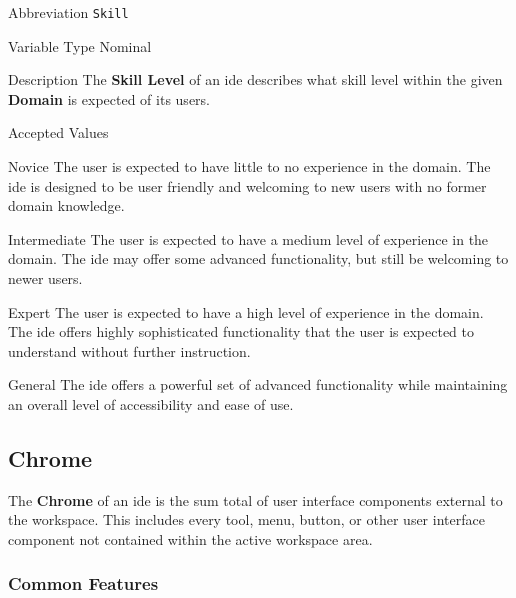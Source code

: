 \begin{AlignedDesc}
  \item[Abbreviation] \texttt{Skill}

  \item[Variable Type] Nominal

  \item[Description] The \textbf{Skill Level} of an \ac{ide} describes what
  skill level within the given \textbf{Domain} is expected of its users.

  \item[Accepted Values]

  \begin{AlignedDesc}
    \item[Novice] The user is expected to have little to no experience in
    the domain. The \ac{ide} is designed to be user friendly and welcoming
    to new users with no former domain knowledge.
    \item[Intermediate] The user is expected to have a medium level of
    experience in the domain. The \ac{ide} may offer some advanced
    functionality, but still be welcoming to newer users.
    \item[Expert] The user is expected to have a high level of experience
    in the domain. The \ac{ide} offers highly sophisticated functionality
    that the user is expected to understand without further instruction.
    \item[General] The \ac{ide} offers a powerful set of advanced
    functionality while maintaining an overall level of accessibility and
    ease of use.
  \end{AlignedDesc}

\end{AlignedDesc}


\subsection{Chrome}
\label{subsec:chrome}

The \textbf{Chrome} of an \ac{ide} is the sum total of user interface
components external to the workspace. This includes every tool, menu,
button, or other user interface component not contained within the active
workspace area.

\subsubsection{Common Features}
\label{subsubsec:features}

